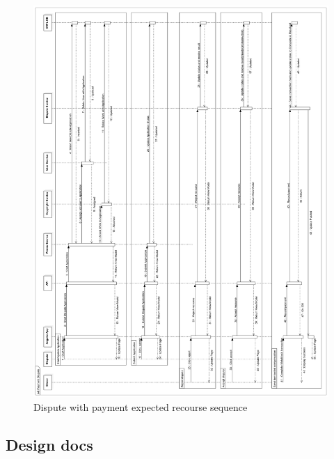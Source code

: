 \begin{figure}[H]
\caption{Dispute with payment expected recourse sequence}
\centering
\includegraphics[width=\textwidth,height=\textheight,keepaspectratio]{images/operational/PaymentDispute}
\end{figure}

\subsection{Design docs}

